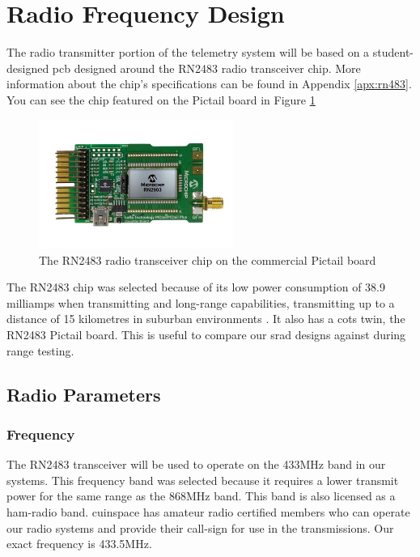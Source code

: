 \section{Radio Frequency Design}

The radio transmitter portion of the telemetry system will be based on a student-designed \gls{pcb} designed around the
RN2483 radio transceiver chip. More information about the chip's specifications can be found in Appendix
\ref{apx:rn483}. You can see the chip featured on the Pictail board in Figure \ref{fig:pictail}

\begin{figure}[H]
    \centering
    \includegraphics[width=2.5in]{assets/images/pictail.jpg}
    \caption{The RN2483 radio transceiver chip on the commercial Pictail board \cite{pictail-img}}
    \label{fig:pictail}
\end{figure}

The RN2483 chip was selected because of its low power consumption of 38.9 milliamps when transmitting \cite[Table
    2-3]{rn2483-datasheet} and long-range capabilities, transmitting up to a distance of 15 kilometres in suburban
environments \cite[1]{rn2483-datasheet}. It also has a \gls{cots} twin, the RN2483 Pictail board. This is useful to
compare our \gls{srad} designs against during range testing.

\subsection{Radio Parameters}

\subsubsection{Frequency}

The RN2483 transceiver will be used to operate on the 433MHz band in our systems. This frequency band was selected
because it requires a lower transmit power for the same range \cite[Table 2-5]{rn2483-datasheet} as the 868MHz band.
This band is also licensed as a \gls{ham-radio} band. \Gls{cuinspace} has amateur radio certified members who can
operate our radio systems and provide their call-sign for use in the transmissions. Our exact frequency is 433.5MHz.

